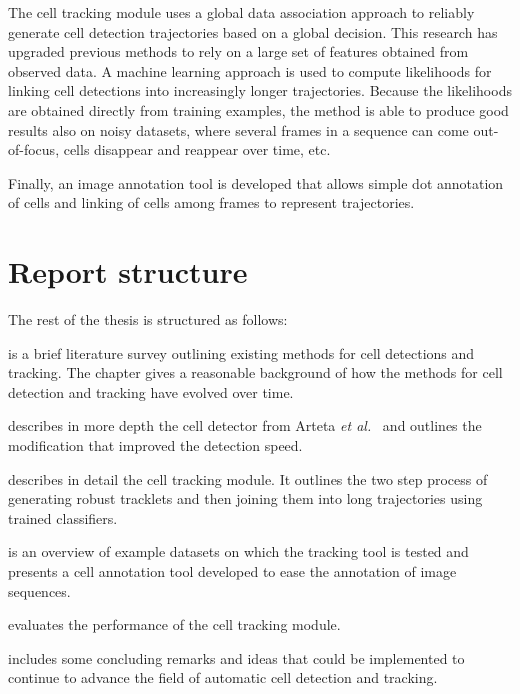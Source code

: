 		The cell tracking module uses a global data association approach to reliably generate cell detection trajectories based on a global decision. This research has upgraded previous methods to rely on a large set of features obtained from observed data. A machine learning approach is used to compute likelihoods for linking cell detections into increasingly longer trajectories. Because the likelihoods are obtained directly from training examples, the method is able to produce good results also on noisy datasets, where several frames in a sequence can come out-of-focus, cells disappear and reappear over time, etc.
		
		Finally, an image annotation tool is developed that allows simple dot annotation of cells and linking of cells among frames to represent trajectories.
		
	\section{Report structure \statusfirstdraft}
		The rest of the thesis is structured as follows:
		
		 is a brief literature survey outlining existing methods for cell detections and tracking. The chapter gives a reasonable background of how the methods for cell detection and tracking have evolved over time.
		
		 describes in more depth the cell detector from Arteta \emph{et al.}~\cite{arteta12} and outlines the modification that improved the detection speed.
		
		 describes in detail the cell tracking module. It outlines the two step process of generating robust tracklets and then joining them into long trajectories using trained classifiers.
	
		 is an overview of example datasets on which the tracking tool is tested and presents a cell annotation tool developed to ease the annotation of image sequences.
		
		 evaluates the performance of the cell tracking module. 
		
		 includes some concluding remarks and ideas that could be implemented to continue to advance the field of automatic cell detection and tracking.